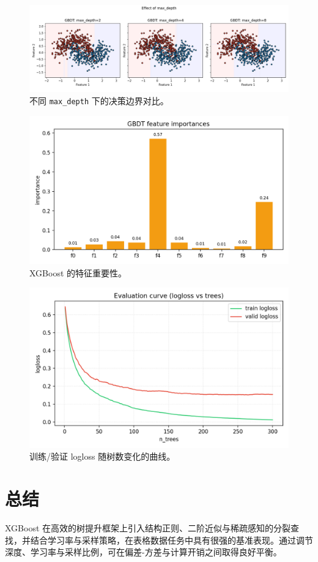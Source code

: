 \documentclass[UTF8,zihao=-4]{ctexart}
\begin{document}
\begin{figure}[H]
  \centering
  \includegraphics[width=0.95\linewidth]{xgb_max_depth_compare.png}
  \caption{不同 \texttt{max\_depth} 下的决策边界对比。}
  \label{fig:xgb_depth_cn}
\end{figure}
\FloatBarrier

\begin{figure}[H]
  \centering
  \includegraphics[width=0.85\linewidth]{xgb_feature_importances.png}
  \caption{XGBoost 的特征重要性。}
  \label{fig:xgb_fi_cn}
\end{figure}
\FloatBarrier

\begin{figure}[H]
  \centering
  \includegraphics[width=0.85\linewidth]{xgb_eval_logloss_curve.png}
  \caption{训练/验证 logloss 随树数变化的曲线。}
  \label{fig:xgb_eval_cn}
\end{figure}
\FloatBarrier

\section{总结}
XGBoost 在高效的树提升框架上引入结构正则、二阶近似与稀疏感知的分裂查找，并结合学习率与采样策略，在表格数据任务中具有很强的基准表现。通过调节深度、学习率与采样比例，可在偏差-方差与计算开销之间取得良好平衡。
\end{document}
